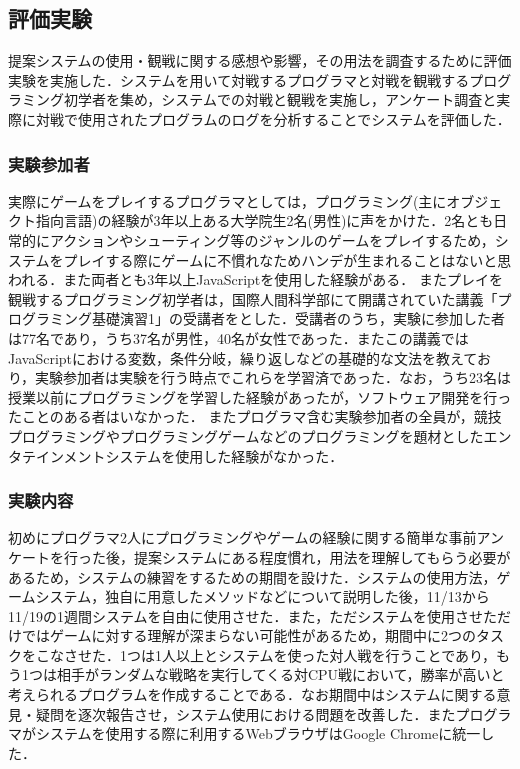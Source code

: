 \subsection{評価実験}
提案システムの使用・観戦に関する感想や影響，その用法を調査するために評価実験を実施した．システムを用いて対戦するプログラマと対戦を観戦するプログラミング初学者を集め，システムでの対戦と観戦を実施し，アンケート調査と実際に対戦で使用されたプログラムのログを分析することでシステムを評価した．

\subsubsection{実験参加者}
実際にゲームをプレイするプログラマとしては，プログラミング(主にオブジェクト指向言語)の経験が3年以上ある大学院生2名(男性)に声をかけた．2名とも日常的にアクションやシューティング等のジャンルのゲームをプレイするため，システムをプレイする際にゲームに不慣れなためハンデが生まれることはないと思われる．また両者とも3年以上JavaScriptを使用した経験がある．
またプレイを観戦するプログラミング初学者は，国際人間科学部にて開講されていた講義「プログラミング基礎演習1」の受講者をとした．受講者のうち，実験に参加した者は77名であり，うち37名が男性，40名が女性であった．またこの講義ではJavaScriptにおける変数，条件分岐，繰り返しなどの基礎的な文法を教えており，実験参加者は実験を行う時点でこれらを学習済であった．なお，うち23名は授業以前にプログラミングを学習した経験があったが，ソフトウェア開発を行ったことのある者はいなかった．
またプログラマ含む実験参加者の全員が，競技プログラミングやプログラミングゲームなどのプログラミングを題材としたエンタテインメントシステムを使用した経験がなかった．

\subsubsection{実験内容}

初めにプログラマ2人にプログラミングやゲームの経験に関する簡単な事前アンケートを行った後，提案システムにある程度慣れ，用法を理解してもらう必要があるため，システムの練習をするための期間を設けた．システムの使用方法，ゲームシステム，独自に用意したメソッドなどについて説明した後，11/13から11/19の1週間システムを自由に使用させた．また，ただシステムを使用させただけではゲームに対する理解が深まらない可能性があるため，期間中に2つのタスクをこなさせた．1つは1人以上とシステムを使った対人戦を行うことであり，もう1つは相手がランダムな戦略を実行してくる対CPU戦において，勝率が高いと考えられるプログラムを作成することである．なお期間中はシステムに関する意見・疑問を逐次報告させ，システム使用における問題を改善した．またプログラマがシステムを使用する際に利用するWebブラウザはGoogle Chromeに統一した．

